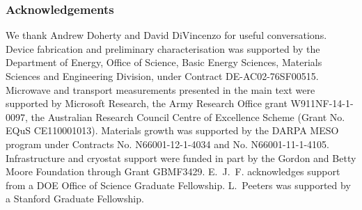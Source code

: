 \subsubsection{Acknowledgements}
We thank Andrew Doherty and David DiVincenzo for useful conversations. Device fabrication and preliminary characterisation was supported by the Department of Energy, Office of Science, Basic Energy Sciences, Materials Sciences and Engineering Division, under Contract DE-AC02-76SF00515. Microwave and transport measurements presented in the main text were supported by Microsoft Research, the Army Research Office grant W911NF-14-1-0097, the Australian Research Council Centre of Excellence Scheme (Grant No. EQuS CE110001013). Materials growth was supported by the DARPA MESO program under Contracts No. N66001-12-1-4034 and No. N66001-11-1-4105. Infrastructure and cryostat support were funded in part by the Gordon and Betty Moore Foundation through Grant GBMF3429. E.~J.~F. acknowledges support from a DOE Office of Science Graduate Fellowship. L.~Peeters was supported by a Stanford Graduate Fellowship.

